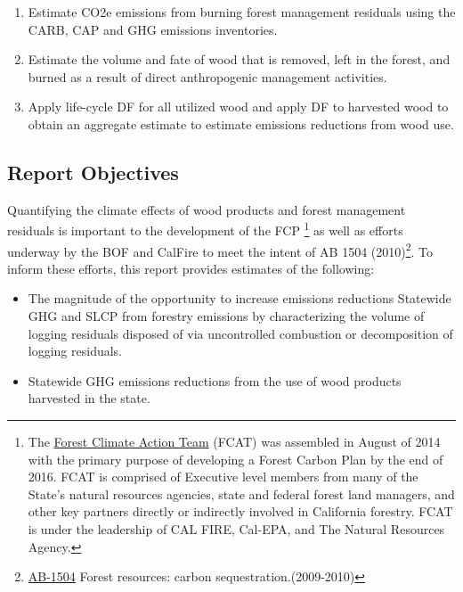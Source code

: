 \documentclass[a4paper,titlepage]{article}
\begin{document}
\begin{enumerate}
\item Estimate \ac{CO2e} emissions from burning forest management
residuals using the \ac{CARB}, \ac{CAP} and \ac{GHG} emissions inventories.

\item Estimate the volume and fate of wood that is removed, left in the
forest, and burned as a result of direct anthropogenic management
activities.

\item Apply life-cycle \ac{DF} for all utilized wood and apply \ac{DF} to harvested wood to obtain an aggregate estimate to estimate emissions reductions from wood use.
\end{enumerate}

\subsection{Report Objectives}
\label{sec:orgheadline1}

Quantifying the climate effects of wood products and forest management
residuals is important to the development of the \ac{FCP} \footnote{The \href{http://www.fire.ca.gov/fcat/}{Forest Climate Action Team} (FCAT) was assembled in August of 2014 with the primary purpose of developing a Forest Carbon Plan by the end of 2016. FCAT is comprised of Executive level members from many of the State’s natural resources agencies, state and federal forest land managers, and other key partners directly or indirectly involved in California forestry. FCAT is under the leadership of CAL FIRE, Cal-EPA, and The Natural Resources Agency.} as well as efforts underway by the \ac{BOF} and CalFire to meet the intent of AB 1504 (2010)\footnote{\href{http://leginfo.legislature.ca.gov/faces/billTextClient.xhtml?bill_id=200920100AB1504}{AB-1504} Forest resources: carbon sequestration.(2009-2010)}. To inform these efforts, this report provides estimates of the following:

\begin{itemize}
\item The magnitude of the opportunity to increase emissions reductions Statewide \ac{GHG} and \ac{SLCP} from forestry emissions by characterizing the volume  of logging residuals disposed of via uncontrolled combustion or decomposition of logging residuals.

\item Statewide \ac{GHG} emissions reductions from the use of wood products harvested in the state.
\end{itemize}
\end{document}
